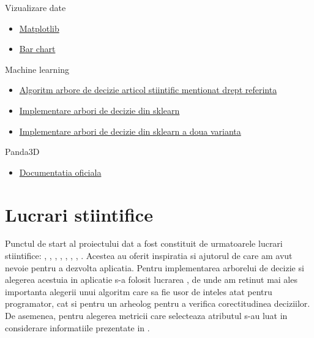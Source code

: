 \documentclass[runningheads,a4paper,11pt]{report}
\begin{document}
\noindent Vizualizare date
\begin{itemize}
    \item \href{https://matplotlib.org/stable/tutorials/introductory/pyplot.html}{Matplotlib}
    \item \href{https://pythonbasics.org/matplotlib-bar-chart/}{Bar chart}
\end{itemize}

\noindent Machine learning
\begin{itemize}
    \item \href{https://en.wikipedia.org/wiki/ID3_algorithm}{Algoritm arbore de decizie articol stiintific mentionat drept referinta}
    \item \href{https://machinelearningmastery.com/classification-and-regression-trees-for-machine-learning/}{Implementare arbori de decizie din sklearn}
    \item \href{https://www.datacamp.com/community/tutorials/decision-tree-classification-python}{Implementare arbori de decizie din sklearn a doua varianta}
\end{itemize}

\noindent Panda3D
\begin{itemize}
    \item \href{https://www.panda3d.org/}{Documentatia oficiala}
\end{itemize}

\chapter{Lucrari stiintifice}
\label{chapter:lucrariStiintifice}

Punctul de start al proiectului dat a fost constituit de urmatoarele lucrari stiintifice: \cite{doc1}, \cite{doc2}, \cite{doc3}, \cite{doc4}, \cite{doc5}, \cite{doc6}, \cite{doc7}, \cite{doc8}. Acestea au oferit inspiratia si ajutorul de care am avut nevoie pentru a dezvolta aplicatia. \newline \newline
Pentru implementarea arborelui de decizie si alegerea acestuia in aplicatie s-a folosit lucrarea  \cite{doc7}, de unde am retinut mai ales importanta alegerii unui algoritm care sa fie usor de inteles atat pentru programator, cat si pentru un arheolog pentru a verifica corectitudinea deciziilor. De asemenea, pentru alegerea metricii care selecteaza atributul s-au luat in considerare informatiile prezentate in \cite{doc6}.



\end{document}
